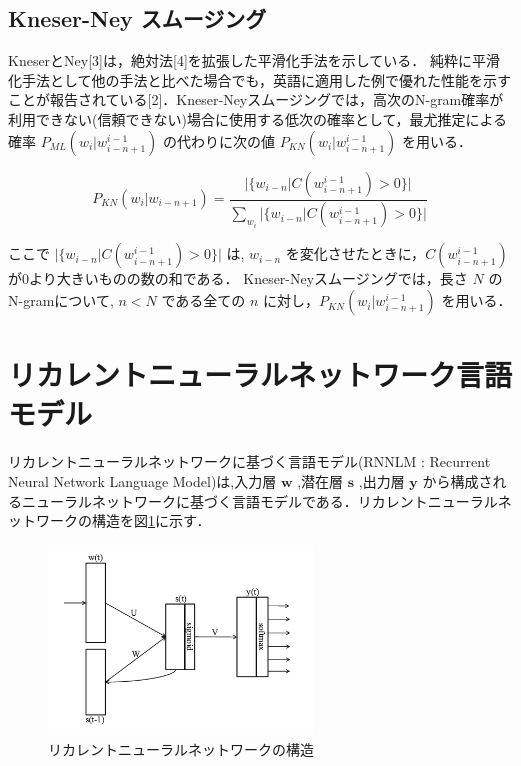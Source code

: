 \subsection{Kneser-Ney スムージング}


KneserとNey[3]は，絶対法[4]を拡張した平滑化手法を示している．
純粋に平滑化手法として他の手法と比べた場合でも，英語に適用した例で優れた性能を示すことが報告されている[2]．Kneser-Neyスムージングでは，高次のN-gram確率が利用できない(信頼できない)場合に使用する低次の確率として，最尤推定による確率 $P_{ML} (w_i|w_{i-n+1}^{i-1})$ の代わりに次の値 $P_{KN} (w_i|w_{i-n+1}^{i-1})$ を用いる．

\begin{equation}
		P_{KN} (w_i|w_{i-n+1}) = \frac{|\{w_{i-n}|C(w_{i-n+1}^{i-1}) > 0\}|}{\sum_{w_i} |\{w_{i-n}|C(w_{i-n+1}^{i-1}) > 0\}|} 
    \label{ngram_smoosing2}
\end{equation}

ここで $|\{w_{i-n}|C(w_{i-n+1}^{i-1}) > 0\}|$ は, $w_{i-n}$ を変化させたときに，$C(w_{i-n+1}^{i-1})$ が0より大きいものの数の和である．
Kneser-Neyスムージングでは，長さ $N$ のN-gramについて, $n  <  N$ である全ての $n$ に対し，$P_{KN} (w_i|w_{i-n+1}^{i-1})$ を用いる．

\section{リカレントニューラルネットワーク言語モデル}
リカレントニューラルネットワークに基づく言語モデル(RNNLM : Recurrent Neural Network Language Model)は,入力層 $\bm{w}$ ,潜在層 $\bm{s}$ ,出力層 $\bm{y}$ から構成されるニューラルネットワークに基づく言語モデルである．リカレントニューラルネットワークの構造を図\ref{fig_rnn}に示す．

\begin{figure}[h]
    \centering
    \includegraphics[width=7cm]{./image/rnn.png}
    \caption{リカレントニューラルネットワークの構造}
    \label{fig_rnn}
\end{figure}

